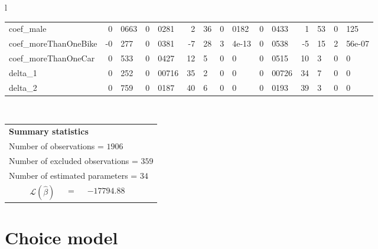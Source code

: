 \documentclass[12pt,a4paper]{article}
\begin{document}
\begin{sidewaystable}[htb]
\begin{tabular}{l}
\begin{tabular}{lr@{.}lr@{.}lr@{.}lr@{.}lr@{.}lr@{.}lr@{.}l}
coef\_male                  &  0&0663 &   0&0281 &    2&36 &   0&0182 &        0&0433 &         1&53 &         0&125 \\
coef\_moreThanOneBike       &  -0&277 &   0&0381 &   -7&28 &  3&4e-13 &        0&0538 &        -5&15 &      2&56e-07 \\
coef\_moreThanOneCar        &   0&533 &   0&0427 &    12&5 &      0&0 &        0&0515 &         10&3 &           0&0 \\
delta\_1                    &   0&252 &  0&00716 &    35&2 &      0&0 &       0&00726 &         34&7 &           0&0 \\
delta\_2                    &   0&759 &   0&0187 &    40&6 &      0&0 &        0&0193 &         39&3 &           0&0 \\
\hline
\end{tabular}
\\
\begin{tabular}{rcl}
\multicolumn{3}{l}{\bf Summary statistics}\\
\multicolumn{3}{l}{ Number of observations = $1906$} \\
\multicolumn{3}{l}{ Number of excluded observations = $359$} \\
\multicolumn{3}{l}{ Number of estimated  parameters = $34$} \\
 $\mathcal{L}(\hat{\beta})$ &=& $-17794.88 $  \\

\end{tabular}
  \end{tabular}

\end{sidewaystable}


\clearpage

\section{Choice model}
\end{document}
